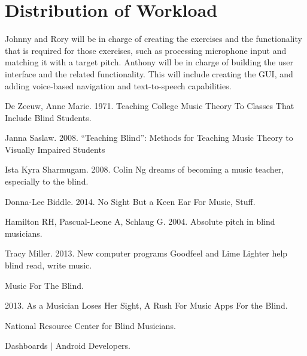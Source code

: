 \documentclass{article}
\begin{document}
\section{Distribution of Workload}
Johnny and Rory will be in charge of creating the exercises and the functionality that is required for those exercises, such as processing microphone input and matching it with a target pitch. Anthony will be in charge of building the user interface and the related functionality. This will include creating the GUI, and adding voice-based navigation and text-to-speech capabilities.

\begin{thebibliography}{10}
	De Zeeuw, Anne Marie. 1971. Teaching College Music Theory To Classes That Include Blind Students. 
	
	Janna Saslaw. 2008. ``Teaching Blind'': Methods for Teaching Music Theory to Visually Impaired Students
	\\\texttt{}
	
	Ista Kyra Sharmugam. 2008. Colin Ng dreams of becoming a music teacher, especially to the blind.
	\\\texttt{}
	
	Donna-Lee Biddle. 2014. No Sight But a Keen Ear For Music, Stuff.
	\\\texttt{}
	
	Hamilton RH, Pascual-Leone A, Schlaug G. 2004. Absolute pitch in blind musicians.	
	\\\texttt{}
	
	Tracy Miller. 2013. New computer programs Goodfeel and Lime Lighter help blind read, write music.
	\\\texttt{}
	
	Music For The Blind.
	\\\texttt{}
	
	2013. As a Musician Loses Her Sight, A Rush For Music Apps For the Blind.
	\\\texttt{}
	
	National Resource Center for Blind Musicians.
	\\\texttt{}
	
	Dashboards $\vert$ Android Developers.
	\\\texttt{}
\end{thebibliography}
	
\end{document}
